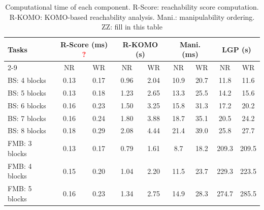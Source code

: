 \documentclass[letterpaper, 10 pt, conference]{ieeeconf}  %
\newcommand{\zz}[1]{{\color{red}ZZ: #1}}
\begin{document}

\begin{table}[!ht]
\centering
\footnotesize
\setlength{\tabcolsep}{3pt}
\caption{Computational time of each component. R-Score: reachability score computation. R-KOMO: KOMO-based reachability analysis. Mani.: manipulability ordering. \zz{fill in this table}}
\label{tab:stage_timing}
\begin{tabular}{l|cccccccc}
\toprule
\multirow{2}{*}{Tasks} & \multicolumn{2}{c}{R-Score (ms) \textcolor{red}{?}} & \multicolumn{2}{c}{R-KOMO (s)} & \multicolumn{2}{c}{Mani. (ms)} & \multicolumn{2}{c}{LGP (s)}\\
\cmidrule{2-9}
 & NR & WR & NR & WR & NR & WR & NR & WR\\
\midrule
BS: 4 blocks & 0.13 & 0.17 & 0.96 & 2.04 & 10.9 & 20.7 & 11.8 & 11.6 \\
BS: 5 blocks & 0.13 & 0.18 & 1.23 & 2.65 & 13.3 & 25.5 & 14.2 & 15.6 \\
BS: 6 blocks & 0.16 & 0.23 & 1.50 & 3.25 & 15.8 & 31.3 & 17.2 & 20.2 \\
BS: 7 blocks & 0.16 & 0.24 & 1.80 & 3.88 & 18.7 & 35.1 & 20.5 & 24.2 \\
BS: 8 blocks & 0.18 & 0.29 & 2.08 & 4.44 & 21.4 & 39.0 & 25.8 & 27.7 \\
\midrule
FMB: 3 blocks & 0.13 & 0.17 & 0.79 & 1.61 & \phantom{0}8.7 & 18.2 & 209.3 & 209.5 \\
FMB: 4 blocks & 0.15 & 0.20 & 1.04 & 2.20 & 11.5 & 23.7 & 229.3 & 223.5 \\
FMB: 5 blocks & 0.16 & 0.23 & 1.34 & 2.75 & 14.9 & 28.3 & 274.7 & 285.5 \\
\bottomrule
\end{tabular}
\end{table}
\end{document}
